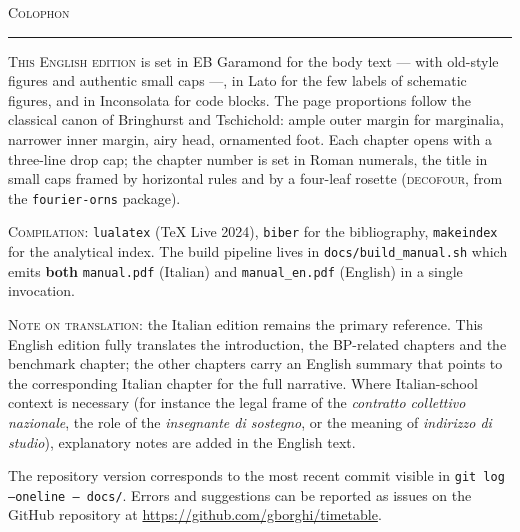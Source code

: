 \thispagestyle{empty}
\null\vfill
\begin{center}
{\Large\color{cIndaco}\decofourleft\enskip\decofourright}\par
\vspace{0.4em}
{\rmfamily\scshape\large Colophon}\par
\vspace{0.2em}
\rule{0.3\textwidth}{0.4pt}
\end{center}
\vspace{0.6em}

\noindent\small\rmfamily
\textsc{This English edition} is set in EB Garamond for the body
text --- with old-style figures and authentic small caps ---,
in Lato for the few labels of schematic figures, and in
Inconsolata for code blocks. The page proportions follow the
classical canon of Bringhurst and Tschichold: ample outer margin
for marginalia, narrower inner margin, airy head, ornamented foot.
Each chapter opens with a three-line drop cap; the chapter number
is set in Roman numerals, the title in small caps framed by
horizontal rules and by a four-leaf rosette
(\textsc{decofour}, from the \texttt{fourier-orns} package).

\bigskip
\noindent\textsc{Compilation}: \texttt{lualatex} (\TeX{} Live 2024),
\texttt{biber} for the bibliography, \texttt{makeindex} for the
analytical index. The build pipeline lives in
\texttt{docs/build\_manual.sh} which emits \textbf{both}
\texttt{manual.pdf} (Italian) and \texttt{manual\_en.pdf} (English)
in a single invocation.

\smallskip
\noindent\textsc{Note on translation}: the Italian edition remains
the primary reference. This English edition fully translates the
introduction, the BP-related chapters and the benchmark chapter;
the other chapters carry an English summary that points to the
corresponding Italian chapter for the full narrative. Where
Italian-school context is necessary (for instance the legal frame
of the \emph{contratto collettivo nazionale}, the role of the
\emph{insegnante di sostegno}, or the meaning of \emph{indirizzo
di studio}), explanatory notes are added in the English text.

\bigskip
\noindent
The repository version corresponds to the most recent commit
visible in \texttt{git log --oneline -- docs/}.
Errors and suggestions can be reported as issues on the GitHub
repository at \url{https://github.com/gborghi/timetable}.

